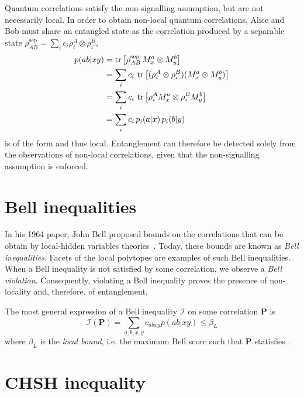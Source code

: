 Quantum correlations satisfy the non-signalling assumption, but are not necessarily local.
In order to obtain non-local quantum correlations, Alice and Bob must share an entangled state as the correlation produced by a separable state $\rho_{AB}^{\mathrm{sep}} = \sum_i c_i \rho^A_i \otimes \rho^B_i$,
\begin{equation}
	\begin{split}
		p(ab|xy) &= \trr{\rho_{AB}^{\mathrm{sep}} \, M^a_x \otimes M^b_y} \\
				 &= \sum_i c_i\, \trr{(\rho^A_i \otimes \rho^B_i) (M^a_x \otimes M^b_y)} \\
				 &= \sum_i c_i\, \trr{\rho^A_i M^a_x \otimes \rho^B_i M^b_y} \\
				 &= \sum_i c_i\, p_i(a|x)\, p_i(b|y)
	\end{split}
\end{equation}
is of the form  and thus local.
Entanglement can therefore be detected solely from the observations of non-local correlations, given that the non-signalling assumption is enforced.

\section{Bell inequalities}

In his 1964 paper, John Bell proposed bounds on the correlations that can be obtain by local-hidden variables theories~\cite{Bell1964}.
Today, these bounds are known as \textit{Bell inequalities}.
Facets of the local polytopes are examples of such Bell inequalities.
When a Bell inequality is not satisfied by some correlation, we observe a \textit{Bell violation}.
Consequently, violating a Bell inequality proves the presence of non-locality and, therefore, of entanglement.

\medbreak

The most general expression of a Bell inequality $\mathcal{I}$ on some correlation $\mathbf{P}$ is
\begin{equation}
	\mathcal{I}(\mathbf{P}) = \sum_{a,b,x,y}c_{abxy} p(ab|xy) \leq \beta_L
	\label{eq:bell_inequality}
\end{equation}
where $\beta_L$ is the \textit{local bound}, i.e. the maximum Bell score such that $\mathbf{P}$ statisfies .

\section{CHSH inequality}


